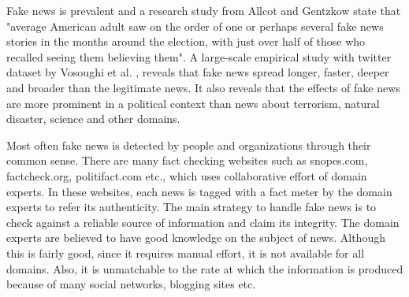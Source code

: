 \documentclass[a4paper, 11pt]{article}
\begin{document}
Fake news is prevalent and a research study from Allcot and Gentzkow \cite{Allcott2017} state that "average American adult saw on the order of one or perhaps several fake news stories in the months around the election, with just over half of those who recalled seeing them believing them". A large-scale empirical study with twitter dataset by Vosoughi et al. \cite{Vosoughi1146}, reveals that fake news spread longer, faster, deeper and broader than the legitimate news. It also reveals that the effects of fake news are more prominent in a political context than news about terrorism, natural disaster, science and other domains.

Most often fake news is detected by people and organizations through their common sense. There are many fact checking websites such as snopes.com, factcheck.org, politifact.com etc., which uses collaborative effort of domain experts. In these websites, each news is tagged with a fact meter by the domain experts to refer its authenticity. The main strategy to handle fake news is to check against a reliable source of information and claim its integrity. The domain experts are believed to have good knowledge on the subject of news. Although this is fairly good, since it requires manual effort, it is not available for all domains. Also, it is unmatchable to the rate at which the information is produced because of many social networks, blogging sites etc.
\end{document}
